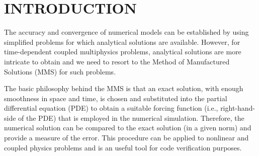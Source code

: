 \section*{INTRODUCTION}
\vspace{-4mm}
The accuracy and convergence of numerical models can be established by using simplified problems for which analytical solutions are available.  However, for time-dependent coupled multiphysics problems, analytical solutions are more intricate to obtain and we need to resort to the Method of Manufactured Solutions (MMS) \cite{roache2002} for such problems.

The basic philosophy behind the MMS is that an exact solution, with enough smoothness in space and time, is chosen and substituted into the partial differential equation (PDE) to obtain a suitable forcing function (i.e., right-hand-side of the PDE) that is employed in the numerical simulation.  Therefore, the numerical solution can be compared to the exact solution (in a given norm) and provide a measure of the error.  This procedure can be applied to nonlinear and coupled physics problems and is an useful tool for code verification purposes.

